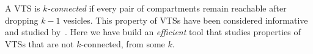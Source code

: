 

%

A VTS is {\em $k$-connected} if every pair of compartments remain
reachable after dropping $k-1$ vesicles.
%
This property of VTSs have been considered informative and
studied by~\cite{shukla}.
%
Here we have build an {\em efficient} tool that studies properties of
VTSs that are not $k$-connected, from some $k$. 

